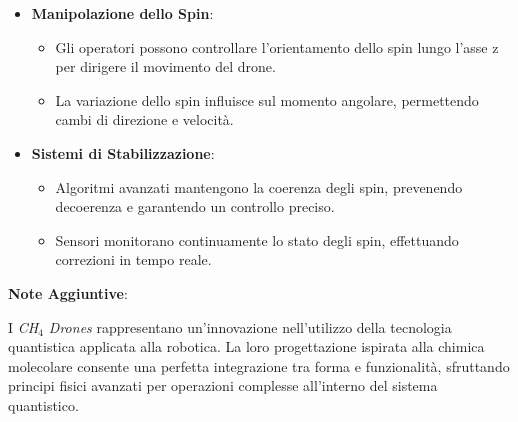 \begin{tcolorbox}[fontupper=\tiny, fontlower=\Large,colback=white,colframe=black,title=\textbf{CH$_4$ Drones} (\emph{Droni Molecolari di Metano} pt.2)]
\begin{multicols}{2}
\begin{itemize}
    \item \textbf{Manipolazione dello Spin}:
    \begin{itemize}
        \item Gli operatori possono controllare l'orientamento dello spin lungo l'asse z per dirigere il movimento del drone.
        \item La variazione dello spin influisce sul momento angolare, permettendo cambi di direzione e velocità.
    \end{itemize}
    \item \textbf{Sistemi di Stabilizzazione}:
    \begin{itemize}
        \item Algoritmi avanzati mantengono la coerenza degli spin, prevenendo decoerenza e garantendo un controllo preciso.
        \item Sensori monitorano continuamente lo stato degli spin, effettuando correzioni in tempo reale.
    \end{itemize}
\end{itemize}

\textbf{Note Aggiuntive}:

I \emph{CH$_4$ Drones} rappresentano un'innovazione nell'utilizzo della tecnologia quantistica applicata alla robotica. La loro progettazione ispirata alla chimica molecolare consente una perfetta integrazione tra forma e funzionalità, sfruttando principi fisici avanzati per operazioni complesse all'interno del sistema quantistico.

\end{multicols}
\end{tcolorbox}

\vspace{0.5cm}

